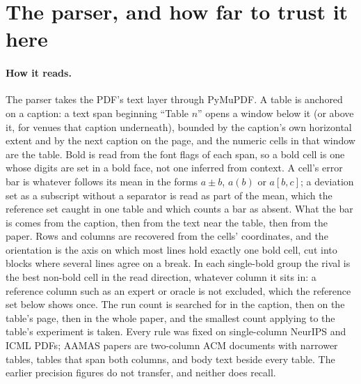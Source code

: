\documentclass[sigconf,anonymous]{aamas}
\begin{document}
\section{The parser, and how far to trust it here}
\label{sec:instrument}

\paragraph{How it reads.} The parser takes the PDF's text layer through
PyMuPDF. A table is anchored on a caption: a text span beginning ``Table $n$''
opens a window below it (or above it, for venues that caption underneath),
bounded by the caption's own horizontal extent and by the next caption on the
page, and the numeric cells in that window are the table. Bold is read from
the font flags of each span, so a bold cell is one whose digits are set in a
bold face, not one inferred from context. A cell's error bar is whatever
follows its mean in the forms $a \pm b$, $a(b)$ or $a[b, c]$; a deviation
set as a subscript without a separator is read as part of the mean, which
the reference set caught in one table and which counts a bar as absent.
What the bar is comes from the caption, then from the text near the table,
then from the paper. Rows and columns are recovered from the cells' coordinates, and the
orientation is the axis on which most lines hold exactly one bold cell, cut
into blocks where several lines agree on a break. In each single-bold group
the rival is the best non-bold cell in the read direction, whatever column it
sits in: a reference column such as an expert or oracle is not excluded,
which the reference set below shows once. The run count is searched for in
the caption, then on the table's page, then in the whole paper, and the
smallest count applying to the table's experiment is taken. Every rule was
fixed on single-column NeurIPS and ICML PDFs; AAMAS papers are two-column
ACM documents with narrower tables, tables that span both columns, and body
text beside every table. The earlier precision figures do not transfer, and
neither does recall.
\end{document}
